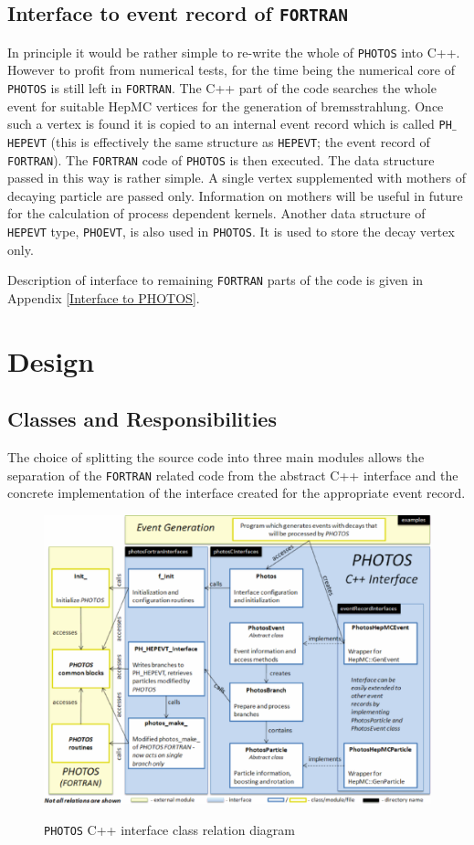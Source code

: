 \documentclass[]{Photos_interface_design}
\begin{document}
\subsection{Interface to event record of {\tt FORTRAN}}
\label{sect:F77fill}

In principle it would be rather simple to re-write the whole of {\tt PHOTOS} into
C++. However to profit from numerical tests, for the time being the numerical core of {\tt PHOTOS}
is still left in {\tt FORTRAN}. The C++ part of the code searches the whole event for
suitable HepMC vertices for the generation of bremsstrahlung. Once such
a vertex is found it is copied to an internal event record  which is 
called  {\tt PH$\_$HEPEVT} (this is effectively the same structure as {\tt HEPEVT};
the event record of {\tt FORTRAN}).
The {\tt FORTRAN} code of {\tt PHOTOS} is then executed.
The data structure passed in this way is rather simple. A single vertex
supplemented with mothers of decaying particle are passed only. Information 
on mothers will be useful in future for the calculation of process dependent 
kernels. Another data structure of   {\tt HEPEVT} type, {\tt PHOEVT}, is also 
used in {\tt PHOTOS}. It is used to store the decay vertex only.  


Description of interface to remaining {\tt FORTRAN} parts of the code is
given in  Appendix \ref{Interface to PHOTOS}.


\section{Design}
\label{sec:design}
\subsection{Classes and Responsibilities}

The choice of splitting the source code into three main modules
 allows the separation of the {\tt FORTRAN} related code from the abstract C++ interface
and the concrete implementation of the interface created for the appropriate
event record.

\begin{figure}[h!]
\centering
\includegraphics[scale=0.6]{interface_design.eps}
\label{fig:design}
\caption{{\tt PHOTOS} C++ interface class relation diagram}
\end{figure}
\end{document}
